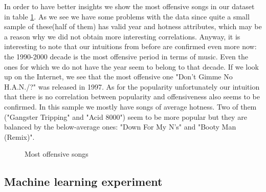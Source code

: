 \documentclass[11pt]{article}
\begin{document}
In order to have better insights we show the most offensive songs in our dataset in table \ref{most_offensive_songs}. As we see we have some problems with the data since quite a small sample of these(half of them) has valid year and hotness attributes, which may be a reason why we did not obtain more interesting correlations. Anyway, it is interesting to note that our intuitions from before are confirmed even more now: the 1990-2000 decade is the most offensive period in terms of music. Even the ones for which we do not have the year seem to belong to that decade. If we look up on the Internet, we see that the most offensive one "Don't Gimme No H.A.N./?" was released in 1997. As for the popularity unfortunately our intuition that there is no correlation between popularity and offensiveness also seems to be confirmed. In this sample we mostly have songs of average hotness. Two of them ("Gangster Tripping" and "Acid 8000") seem to be more popular but they are balanced by the below-average ones: "Down For My N's" and "Booty Man (Remix)".

\begin{figure}
\centering

\caption{Most offensive songs}
\label{most_offensive_songs}
\end{figure}

\subsection{Machine learning experiment}
\end{document}
